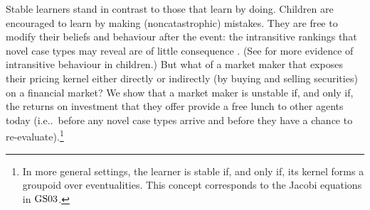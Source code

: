 \documentclass[ecta,nameyear,draft]{econsocart}
\makeatletter
\newcommand\ie{i\@.e\@ifnextchar.{}{.\@}}
\newcommand{\gsii}{$\textup{GS03}$}
\theoremstyle{plain}
\theoremstyle{remark}
\makeatother
\begin{document}
Stable learners stand in contrast to those that learn by doing.
Children are encouraged to learn by making (noncatastrophic) mistakes. They are
free to modify their beliefs and behaviour after the event: the intransitive
rankings that novel case types may reveal are of little consequence
\citep{bradbury1990effects}. (See
\citep{weinstein1968transitivity,bradbury1974transitivity} for more evidence of
intransitive behaviour in children.) But what of a market maker that exposes
their pricing kernel either directly or indirectly (by buying and selling
securities) on a financial market? We show that a market maker is unstable if,
and only if, the returns on investment that they offer provide a free lunch to
other agents today (\ie\ before any novel case types arrive and before they
have a chance to re-evaluate).\footnote{In more general settings, the learner
  is stable if, and only if, its kernel forms a groupoid over eventualities.
This concept corresponds to the Jacobi equations in \gsii.}
\end{document}
